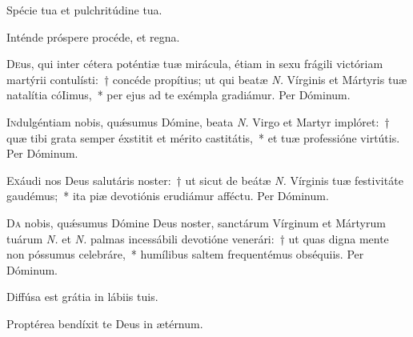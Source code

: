 \documentclass[vesperale_romanum.tex]{subfiles}
\begin{document}

\vel


\vv Spécie tua et pulchritúdine tua. \tpalleluia

\rr Inténde próspere procéde, et regna. \tpalleluia

\admagnificat
\label{an_veni_sponsa_christi_i_vesperis_solesmes_1961}


\lettrine{D}{e}us, qui inter cétera poténtiæ tuæ mirácula, étiam in sexu frágili vi\-ctóriam martýrii contulísti:~† concéde propítius; ut qui beatæ \textit{N.} Vírginis et Mártyris tuæ natalítia cóIimus,~* per ejus ad te exémpla gradiámur. Per Dóminum.

\aliaoratio

\lettrine{I}{n}dulgéntiam nobis, quǽsumus Dómine, beata \textit{N.} Virgo et Martyr implóret:~† quæ tibi grata semper éxstitit et mérito castitátis,~* et tuæ professióne virtútis. Per Dóminum.



\lettrine{E}{x}áudi nos Deus salutáris noster:~† ut sicut de beátæ \textit{N.} Vírginis tuæ festivitáte gaudémus;~* ita piæ devotiónis erudiámur afféctu.
Per Dóminum.


\label{an_prudentes_virgines_solesmes_1961}

\oratio

\lettrine{D}{a} nobis, quǽsumus Dómine Deus noster, san\-ctárum Vírginum et Mártyrum tuárum \textit{N.} et \textit{N.} palmas incessábili devotióne venerári:~† ut quas digna mente non póssumus celebráre,~* humílibus saltem frequentémus obséquiis. Per Dóminum.


\omniapraeter %

\vv Diffúsa est grátia in lábiis tuis. \tpalleluia

\rr Proptérea bendíxit te Deus in ætérnum. \tpalleluia

\admagnificat
\label{an_veni_sponsa_christi_ii_vesperis_solesmes_1961}
\end{document}
